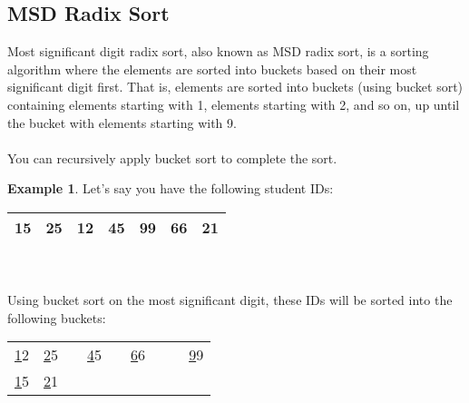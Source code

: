 \documentclass[]{article}
\theoremstyle{definition}
\newtheorem{ex}{Example}[section]
\begin{document}
				\subsection{MSD Radix Sort}
					Most significant digit radix sort, also known as MSD radix sort, is a sorting algorithm where the elements are sorted into buckets based on their most significant digit first. That is, elements are sorted into buckets (using bucket sort) containing elements starting with 1, elements starting with 2, and so on, up until the bucket with elements starting with 9.
					\\ \\
					You can recursively apply bucket sort to complete the sort.
					\begin{ex}
						Let's say you have the following student IDs: \begin{tabular}{|c|c|c|c|c|c|c|} \hline 15 & 25 & 12 & 45 & 99 & 66 & 21 \\ \hline \end{tabular}
						\\ \\
						Using bucket sort on the most significant digit, these IDs will be sorted into the following buckets: \\
						\begin{center}
							\begin{tabular}{|c|c|c|c|c|c|c|c|c|}
								\hline
								\underline{1}2 & \underline{2}5 & & \underline{4}5 & & \underline{6}6 & & & \underline{9}9 \\
								\underline{1}5 & \underline{2}1 & & & & & & & \\ \hline
							\end{tabular}
						\end{center}
					\end{ex}
\end{document}
